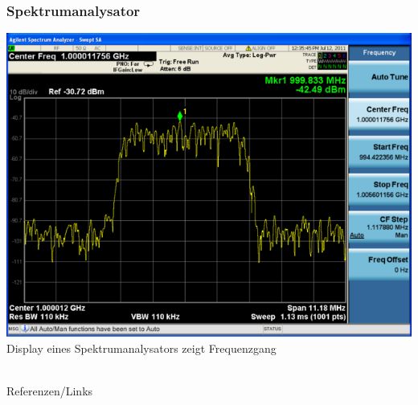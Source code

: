 \begin{frame}
  \frametitle{Spektrumanalysator}
  \begin{center}
    \includegraphics[width=\textwidth,height=.8\textheight,keepaspectratio]{a16/Spektrumanalysator-Display.png}\\
    {\tiny Display eines Spektrumanalysators zeigt Frequenzgang \href{refs}{\cite{wp}}}
  \end{center}
\end{frame}

\renewcommand{\refname}{Referenzen}

\hypertarget{refs}{}
\textcolor{white}{} \\ %
\Large Referenzen/Links
\footnotesize

